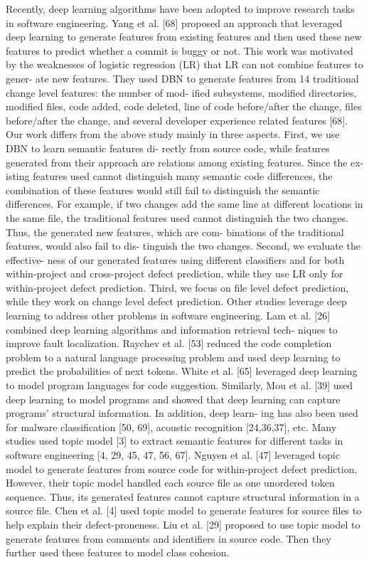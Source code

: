 \documentclass{article}
\begin{document}
Recently, deep learning algorithms have been adopted to improve research tasks in software engineering. Yang et al. [68] proposed an approach that leveraged deep learning to generate features from existing features and then used these new features to predict whether a commit is buggy or not. This work was motivated by the weaknesses of logistic regression (LR) that LR can not combine features to gener- ate new features. They used DBN to generate features from 14 traditional change level features: the number of mod- ified subsystems, modified directories, modified files, code added, code deleted, line of code before/after the change, files before/after the change, and several developer experience related features [68].
Our work differs from the above study mainly in three aspects. First, we use DBN to learn semantic features di- rectly from source code, while features generated from their approach are relations among existing features. Since the ex- isting features used cannot distinguish many semantic code differences, the combination of these features would still fail to distinguish the semantic differences. For example, if two changes add the same line at different locations in the same file, the traditional features used cannot distinguish the two changes. Thus, the generated new features, which are com- binations of the traditional features, would also fail to dis- tinguish the two changes. Second, we evaluate the effective- ness of our generated features using different classifiers and for both within-project and cross-project defect prediction,
while they use LR only for within-project defect prediction. Third, we focus on file level defect prediction, while they work on change level defect prediction.
Other studies leverage deep learning to address other problems in software engineering. Lam et al. [26] combined deep learning algorithms and information retrieval tech- niques to improve fault localization. Raychev et al. [53] reduced the code completion problem to a natural language processing problem and used deep learning to predict the probabilities of next tokens. White et al. [65] leveraged deep learning to model program languages for code suggestion. Similarly, Mou et al. [39] used deep learning to model programs and showed that deep learning can capture programs’ structural information. In addition, deep learn- ing has also been used for malware classification [50, 69], acoustic recognition [24,36,37], etc.
Many studies used topic model [3] to extract semantic features for different tasks in software engineering [4, 29, 45, 47, 56, 67]. Nguyen et al. [47] leveraged topic model to generate features from source code for within-project defect prediction. However, their topic model handled each source file as one unordered token sequence. Thus, its generated features cannot capture structural information in a source file. Chen et al. [4] used topic model to generate features for source files to help explain their defect-proneness. Liu et al. [29] proposed to use topic model to generate features from comments and identifiers in source code. Then they further used these features to model class cohesion.
\end{document}
